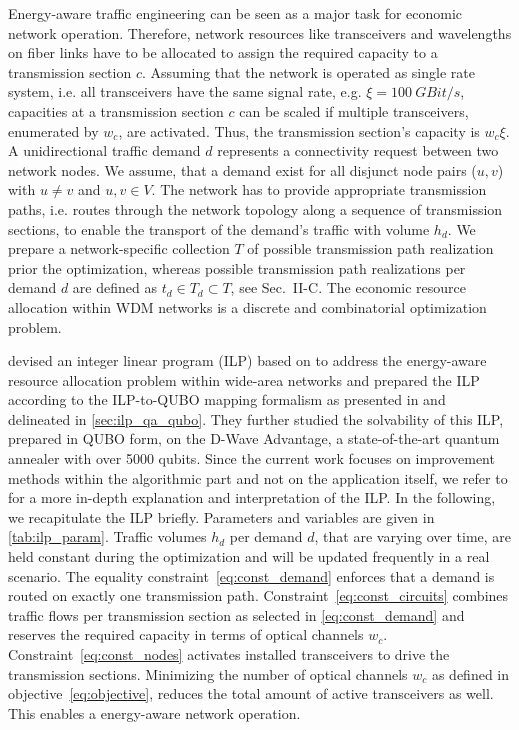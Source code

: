 \documentclass[utf8, nocrop]{FrontiersinHarvardArxiv}
\begin{document}
Energy-aware traffic engineering can be seen as a major task for economic network operation. Therefore, network resources like transceivers and wavelengths on fiber links have to be allocated to assign the required capacity to a transmission section  $c$. Assuming that the network is operated as single rate system, i.e. all transceivers have the same signal rate, e.g. $\xi=\SI{100}{GBit/s}$, capacities at a transmission section $c$ can be scaled if multiple transceivers, enumerated by $w_c$, are activated. Thus, the transmission section's capacity is $w_c\xi$. A unidirectional traffic demand $d$ represents a connectivity request between two network nodes. We assume, that a demand exist for all disjunct node pairs ($u,v$) with $u\neq v$ and $u,v \in V$. The network has to provide appropriate transmission paths, i.e. routes through the network topology along a sequence of transmission sections, to enable the transport of the demand's traffic with volume $h_d$. We prepare a network-specific collection $T$ of possible transmission path realization prior the optimization, whereas possible transmission path realizations per demand $d$ are defined as $t_d\in T_d \subset T$, see \cite{Witt:2022lsx} Sec.~II-C. The economic resource allocation within WDM networks is a discrete and combinatorial optimization problem.

\cite{Witt:2022lsx} devised an integer linear program (ILP) based on \cite{IKR2} to address the energy-aware resource allocation problem within wide-area networks and prepared the ILP according to the ILP-to-QUBO mapping formalism as presented in \cite{Chang:2020iwh} and delineated in \autoref{sec:ilp_qa_qubo}. They further studied the solvability of this ILP, prepared in QUBO form, on the D-Wave Advantage\texttrademark, a state-of-the-art quantum annealer with over 5000 qubits. Since the current work focuses on improvement methods within the algorithmic part and not on the application itself, we refer to \cite{Witt:2022lsx} for a more in-depth explanation and interpretation of the ILP. In the following, we recapitulate the ILP briefly. Parameters and variables are given in \autoref{tab:ilp_param}. Traffic volumes $h_d$ per demand $d$, that are varying over time, are held constant during the optimization and will be updated frequently in a real scenario. The equality constraint~\eqref{eq:const_demand} enforces that a demand is routed on exactly one transmission path. Constraint~\eqref{eq:const_circuits} combines traffic flows per transmission section as selected in \eqref{eq:const_demand} and reserves the required capacity in terms of optical channels $w_c$. 
Constraint~\eqref{eq:const_nodes} activates installed transceivers to drive the transmission sections. 
Minimizing the number of optical channels $w_c$ as defined in objective~\eqref{eq:objective}, reduces the total amount of active transceivers as well. This enables a energy-aware network operation. 
\end{document}
